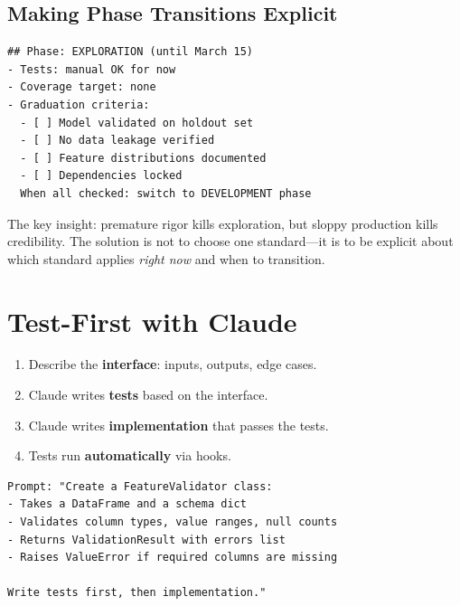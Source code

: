 \subsection{Making Phase Transitions Explicit}


\begin{verbatim}
## Phase: EXPLORATION (until March 15)
- Tests: manual OK for now
- Coverage target: none
- Graduation criteria:
  - [ ] Model validated on holdout set
  - [ ] No data leakage verified
  - [ ] Feature distributions documented
  - [ ] Dependencies locked
  When all checked: switch to DEVELOPMENT phase
\end{verbatim}

The key insight: premature rigor kills exploration,
but sloppy production kills credibility.
The solution is not to choose one standard---it is to be explicit about
which standard applies \emph{right now} and when to transition.

\section{Test-First with Claude}
\label{sec:test-first}



\begin{enumerate}
  \item Describe the \textbf{interface}: inputs, outputs, edge cases.
  \item Claude writes \textbf{tests} based on the interface.
  \item Claude writes \textbf{implementation} that passes the tests.
  \item Tests run \textbf{automatically} via hooks.
\end{enumerate}

\begin{verbatim}
Prompt: "Create a FeatureValidator class:
- Takes a DataFrame and a schema dict
- Validates column types, value ranges, null counts
- Returns ValidationResult with errors list
- Raises ValueError if required columns are missing

Write tests first, then implementation."
\end{verbatim}

